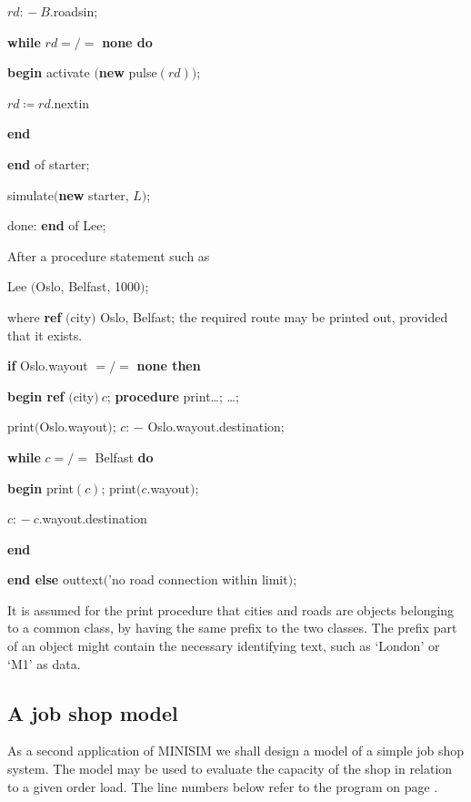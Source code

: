 \quad \quad \quad \quad \quad $rd$: $-\ B$.roadsin;

\quad \quad \quad \quad \quad \textbf{while} $rd =/=$ \textbf{none do}

\quad \quad \quad \quad \quad \quad \textbf{begin} activate $($\textbf{new} pulse$(rd))$;

\quad \quad \quad \quad \quad \quad \quad \quad $rd \coloneq rd$.nextin

\quad \quad \quad \quad \quad \quad \textbf{end}

\quad \quad \quad \quad \textbf{end} of starter;

\quad \quad \quad \quad simulate$($\textbf{new} starter, $L)$;

\quad \quad done: \textbf{end} of Lee;

\noindent
After a procedure statement such as

\quad Lee $($Oslo, Belfast, 1000$)$;

\noindent
where \textbf{ref} $($city$)$ Oslo, Belfast; the required route may be printed out, provided that it exists.

\quad \textbf{if} Oslo.wayout $=/=$ \textbf{none then}

\quad \textbf{begin ref} $($city$)\ c$; \textbf{procedure} print\dots; \dots;

\quad \quad print$($Oslo.wayout$)$; $c$: $-$ Oslo.wayout.destination;

\quad \quad \textbf{while} $c =/=$ Belfast \textbf{do}

\quad \quad \textbf{begin} print$(c)$; print$(c$.wayout$)$;

\quad \quad \quad $c$: $-\ c$.wayout.destination

\quad \quad \textbf{end}

\quad \textbf{end else} outtext$($'no road connection within limit$)$;

\noindent
It is assumed for the print procedure that cities and roads are objects belonging to a common class, by having the same prefix to the two classes. The prefix part of an object might contain the necessary identifying text, such as `London' or `M1' as data.

\subsection{A job shop model}

As a second application of MINISIM we shall design a model of a simple job shop system. The model may be used to evaluate the capacity of the shop in relation to a given order load. The line numbers below refer to the program on page \pageref{pg:program-job-shop}.

